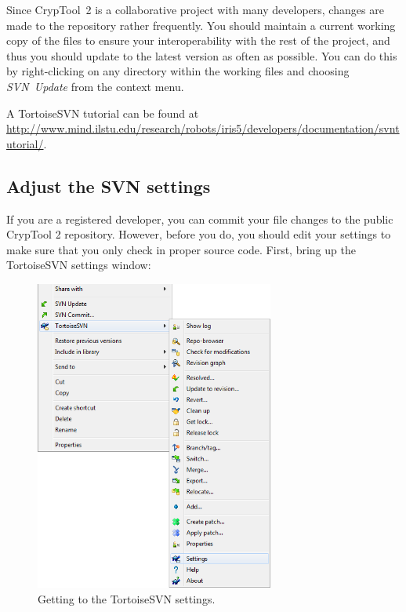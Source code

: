 Since CrypTool~2 is a collaborative project with many developers, changes are made to the repository rather frequently. You should maintain a current working copy of the files to ensure your interoperability with the rest of the project, and thus you should update to the latest version as often as possible. You can do this by right-clicking on any directory within the working files and choosing \textit{SVN~Update} from the context menu.

A TortoiseSVN tutorial can be found at \url{http://www.mind.ilstu.edu/research/robots/iris5/developers/documentation/svntutorial/}.
\clearpage

\subsection{Adjust the SVN settings}
\label{AdjustingTheSVNSettings}

If you are a registered developer, you can commit your file changes to the public CrypTool 2 repository. However, before you do, you should edit your settings to make sure that you only check in proper source code. First, bring up the TortoiseSVN settings window:

\begin{figure}[h!]
	\centering
		\includegraphics[width=0.70\textwidth]{figures/tortoise_svn_accessing_settings.png}
	\caption{Getting to the TortoiseSVN settings.}
	\label{fig:tortoise_svn_accessing_settings}
\end{figure}
\clearpage

